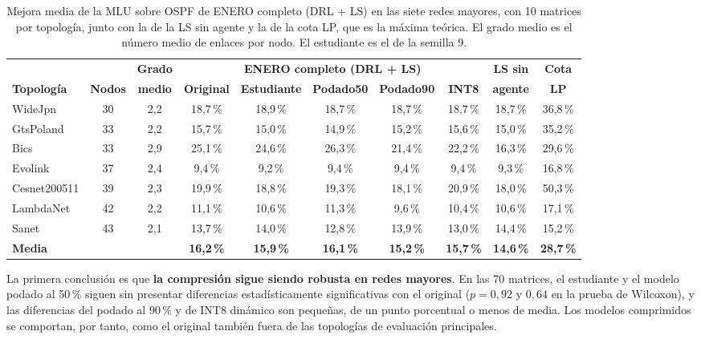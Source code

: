\begin{table}[H]
	\centering
	\footnotesize
	\setlength{\tabcolsep}{3.5pt}
	\begin{adjustbox}{max width=\textwidth}
	\begin{tabular}{lcc|ccccc|cc}
		\toprule
		& & \textbf{Grado} & \multicolumn{5}{c|}{\textbf{ENERO completo (DRL + LS)}} & \textbf{LS sin} & \textbf{Cota} \\
		\textbf{Topología} & \textbf{Nodos} & \textbf{medio} & \textbf{Original} & \textbf{Estudiante} & \textbf{Podado50} & \textbf{Podado90} & \textbf{INT8} & \textbf{agente} & \textbf{LP} \\
		\midrule
		WideJpn & 30 & 2,2 & 18,7\,\% & 18,9\,\% & 18,7\,\% & 18,7\,\% & 18,7\,\% & 18,7\,\% & 36,8\,\% \\
		GtsPoland & 33 & 2,2 & 15,7\,\% & 15,0\,\% & 14,9\,\% & 15,2\,\% & 15,6\,\% & 15,0\,\% & 35,2\,\% \\
		Bics & 33 & 2,9 & 25,1\,\% & 24,6\,\% & 26,3\,\% & 21,4\,\% & 22,2\,\% & 16,3\,\% & 29,6\,\% \\
		Evolink & 37 & 2,4 & 9,4\,\% & 9,2\,\% & 9,4\,\% & 9,4\,\% & 9,4\,\% & 9,3\,\% & 16,8\,\% \\
		Cesnet200511 & 39 & 2,3 & 19,9\,\% & 18,8\,\% & 19,3\,\% & 18,1\,\% & 20,9\,\% & 18,0\,\% & 50,3\,\% \\
		LambdaNet & 42 & 2,2 & 11,1\,\% & 10,6\,\% & 11,3\,\% & 9,6\,\% & 10,4\,\% & 10,6\,\% & 17,1\,\% \\
		Sanet & 43 & 2,1 & 13,7\,\% & 14,0\,\% & 12,8\,\% & 13,9\,\% & 13,0\,\% & 14,4\,\% & 15,2\,\% \\
		\midrule
		\textbf{Media} & & & \textbf{16,2\,\%} & \textbf{15,9\,\%} & \textbf{16,1\,\%} & \textbf{15,2\,\%} & \textbf{15,7\,\%} & \textbf{14,6\,\%} & \textbf{28,7\,\%} \\
		\bottomrule
	\end{tabular}
	\end{adjustbox}
	\caption[Resultados en las redes mayores]{Mejora media de la MLU sobre OSPF de ENERO completo (DRL + LS) en las siete redes mayores, con 10 matrices por topología, junto con la de la LS sin agente y la de la cota LP, que es la máxima teórica. El grado medio es el número medio de enlaces por nodo. El estudiante es el de la semilla 9.}
	\label{tab:res_escal}
\end{table}

La primera conclusión es que \textbf{la compresión sigue siendo robusta en redes mayores}. En las 70 matrices, el estudiante y el modelo podado al 50\,\% siguen sin presentar diferencias estadísticamente significativas con el original ($p = 0{,}92$ y $0{,}64$ en la prueba de Wilcoxon), y las diferencias del podado al 90\,\% y de INT8 dinámico son pequeñas, de un punto porcentual o menos de media. Los modelos comprimidos se comportan, por tanto, como el original también fuera de las topologías de evaluación principales.

